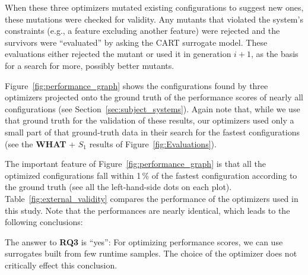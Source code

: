 \documentclass{newsig}
\newcommand{\fig}[1]{Figure~\ref{fig:#1}}
\newcommand{\what}{{\bf WHAT }}
\begin{document}
When these three optimizers mutated existing configurations to suggest new ones,
these mutations were checked for validity. Any mutants that violated the system's constraints (e.g., a feature excluding another feature) were rejected
and the survivors were ``evaluated'' by asking the CART surrogate model.
These evaluations either rejected the mutant or used it in generation $i+1$, as the basis for a search for more, possibly
better  mutants.





\fig{performance_graph} shows the configurations found by three optimizers projected onto the ground truth of the performance scores of nearly
all configurations (see Section~\ref{sec:subject_systems}). Again note that, while we use that ground truth for the validation of these results, our optimizers 
used only a small part of that ground-truth data in their search for the fastest configurations (see the \what + $S_1$
results of \fig{Evaluations}).





The important feature of \fig{performance_graph} is that all the optimized configurations fall within 1\,\% of the fastest
configuration according to the ground truth (see all the left-hand-side dots on each plot). Table~\ref{fig:external_validity} compares the performance of the optimizers
used in this study. Note that the performances are nearly identical, which leads to the following conclusions:

\begin{myshadowbox}
The answer to {\bf RQ3} is ``yes'': For optimizing performance scores, we can use surrogates built from few runtime samples. The choice of the optimizer does not critically effect this conclusion.
\end{myshadowbox}
\end{document}
